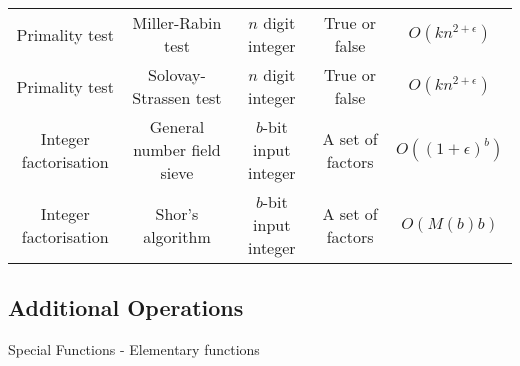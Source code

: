 \documentclass{article}
\begin{document}
\begin{table}[ht]
\begin{tabular}{c cccc}
		Primality test & Miller-Rabin test\footnotemark[5] \footnotemark[6] & $n$ digit integer & True or false & $O(kn^{2+\epsilon})$ \\
		Primality test & Solovay-Strassen test\footnotemark[5] \footnotemark[6] & $n$ digit integer & True or false & $O(kn^{2+\epsilon})$ \\
		Integer factorisation & General number field sieve\footnotemark[5] & $b$-bit input integer & A set of factors & $O((1+\epsilon)^b)$ \\
		Integer factorisation & Shor's algorithm \footnotemark[4] \footnotemark[7] & $b$-bit input integer & A set of factors & $O(M(b)b)$ \\
		\hline
	\end{tabular}
\end{table}


\newpage
\subsection*{Additional Operations}

Special Functions - Elementary functions
\end{document}

